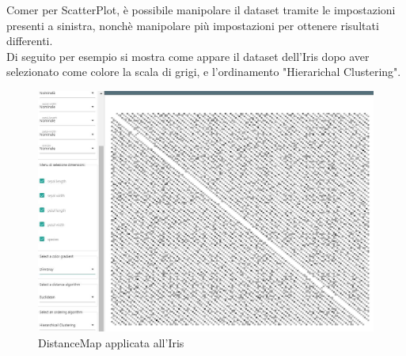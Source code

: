 \documentclass[../manuale_utente.tex]{subfiles}
\begin{document}
Comer per ScatterPlot, è possibile manipolare il dataset tramite le impostazioni presenti a sinistra, nonchè manipolare più impostazioni per ottenere risultati differenti.\\
Di seguito per esempio si mostra come appare il dataset dell'Iris dopo aver selezionato come colore la scala di grigi, e l'ordinamento "Hierarichal Clustering".


\begin{figure}[H]
	\centering
	\includegraphics[width=18cm]{img/dm/iris_clustering_euclideo_dm.jpg}
	\caption{DistanceMap applicata all'Iris}
\end{figure}
\end{document}
